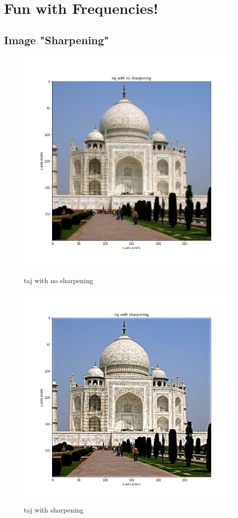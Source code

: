 \documentclass{article}
\begin{document}
\section{Fun with Frequencies!}
\subsection{Image "Sharpening"}

\begin{figure}[!htb]
    \includegraphics[width=\linewidth]{taj with no sharpening.png}
    \caption{taj with no sharpening}\label{fig:awesome_image1}
\endminipage
{}
    \includegraphics[width=\linewidth]{taj with sharpening.png}
    \caption{taj with sharpening}\label{fig:awesome_image2}
\endminipage
\end{figure}
\end{document}
